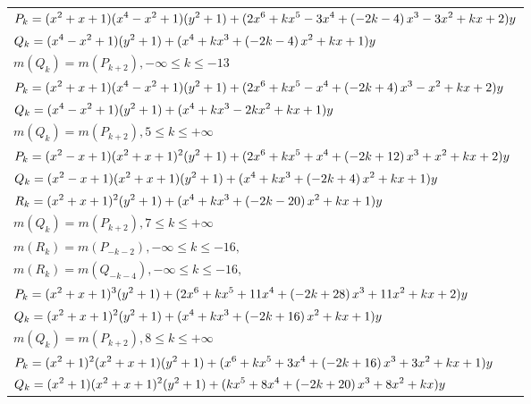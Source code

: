\documentclass{amsart}
\begin{document}
\begin{longtable}{|l|}
\hline
\(\displaystyle P_k=(x^2
 + x
 + 1)(x^4
 - x^2
 + 1)(y^2+1)+(2\*x^6
 + k\*x^5
 - 3\*x^4
 + \left(-2\*k
 - 4\right) \*x^3
 - 3\*x^2
 + k\*x
 + 2)y\)\\
\(\displaystyle Q_k=(x^4
 - x^2
 + 1)(y^2+1)+(x^4
 + k\*x^3
 + \left(-2\*k
 - 4\right) \*x^2
 + k\*x
 + 1)y\)\\
\(\displaystyle m(Q_k) = m(P_{k
 + 2}),-\infty \leqslant k \leqslant -13\)\\
\hline
\(\displaystyle P_k=(x^2
 + x
 + 1)(x^4
 - x^2
 + 1)(y^2+1)+(2\*x^6
 + k\*x^5
 - x^4
 + \left(-2\*k
 + 4\right) \*x^3
 - x^2
 + k\*x
 + 2)y\)\\
\(\displaystyle Q_k=(x^4
 - x^2
 + 1)(y^2+1)+(x^4
 + k\*x^3
 - 2\*k\*x^2
 + k\*x
 + 1)y\)\\
\(\displaystyle m(Q_k) = m(P_{k
 + 2}),5 \leqslant k \leqslant +\infty\)\\
\hline
\(\displaystyle P_k=(x^2
 - x
 + 1)(x^2
 + x
 + 1)^{2}(y^2+1)+(2\*x^6
 + k\*x^5
 + x^4
 + \left(-2\*k
 + 12\right) \*x^3
 + x^2
 + k\*x
 + 2)y\)\\
\(\displaystyle Q_k=(x^2
 - x
 + 1)(x^2
 + x
 + 1)(y^2+1)+(x^4
 + k\*x^3
 + \left(-2\*k
 + 4\right) \*x^2
 + k\*x
 + 1)y\)\\
\(\displaystyle R_k=(x^2
 + x
 + 1)^{2}(y^2+1)+(x^4
 + k\*x^3
 + \left(-2\*k
 - 20\right) \*x^2
 + k\*x
 + 1)y\)\\
\(\displaystyle m(Q_k) = m(P_{k
 + 2}),7 \leqslant k \leqslant +\infty\)\\
\(\displaystyle m(R_k) = m(P_{-k
 - 2}),-\infty \leqslant k \leqslant -16,\quad \)\\
\(\displaystyle m(R_k) = m(Q_{-k
 - 4}),-\infty \leqslant k \leqslant -16,\quad \)\\
\hline
\(\displaystyle P_k=(x^2
 + x
 + 1)^{3}(y^2+1)+(2\*x^6
 + k\*x^5
 + 11\*x^4
 + \left(-2\*k
 + 28\right) \*x^3
 + 11\*x^2
 + k\*x
 + 2)y\)\\
\(\displaystyle Q_k=(x^2
 + x
 + 1)^{2}(y^2+1)+(x^4
 + k\*x^3
 + \left(-2\*k
 + 16\right) \*x^2
 + k\*x
 + 1)y\)\\
\(\displaystyle m(Q_k) = m(P_{k
 + 2}),8 \leqslant k \leqslant +\infty\)\\
\hline
\(\displaystyle P_k=(x^2
 + 1)^{2}(x^2
 + x
 + 1)(y^2+1)+(x^6
 + k\*x^5
 + 3\*x^4
 + \left(-2\*k
 + 16\right) \*x^3
 + 3\*x^2
 + k\*x
 + 1)y\)\\
\(\displaystyle Q_k=(x^2
 + 1)(x^2
 + x
 + 1)^{2}(y^2+1)+(k\*x^5
 + 8\*x^4
 + \left(-2\*k
 + 20\right) \*x^3
 + 8\*x^2
 + k\*x)y\)\\

\end{longtable}
\end{document}
